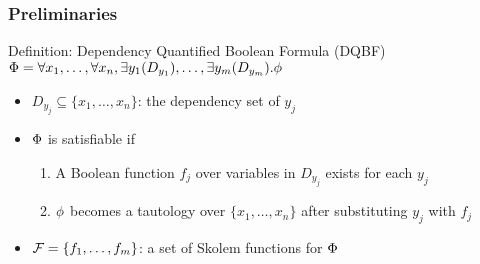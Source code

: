 \begin{frame}
  \frametitle{Preliminaries}
  \begin{block}{Definition: Dependency Quantified Boolean Formula (DQBF)}
    $\Phi=\forall x_1, \ldots, \forall x_n, \exists y_1(D_{y_1}), \ldots, \exists y_m(D_{y_m}).\phi$
    \pause
    \begin{itemize}
      \item $D_{y_j} \subseteq \{x_1,\ldots,x_n\}$: the \alert{dependency set} of $y_j$
            \pause
      \item $\Phi$ is satisfiable if
            \pause
            \begin{enumerate}
              \item A Boolean function $f_j$ over variables in $D_{y_j}$ exists for each $y_j$
                    \pause
              \item $\phi$ becomes a tautology over $\{x_1,\ldots,x_n\}$ after substituting $y_j$ with $f_j$
            \end{enumerate}
            \pause
      \item $\mathcal{F}=\{f_1,\ldots,f_m\}$: a set of Skolem functions for $\Phi$
    \end{itemize}
  \end{block}
\end{frame}